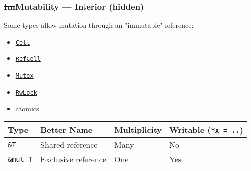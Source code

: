 \documentclass[t]{beamer}
\begin{document}
\begin{frame}[fragile]
\frametitle{\st{Im}Mutability --- Interior (hidden)}

Some types allow mutation through an "immutable" reference:

\begin{itemize}
\item \href{https://doc.rust-lang.org/std/cell/struct.Cell.html}{\texttt{Cell}}
\item \href{https://doc.rust-lang.org/std/cell/struct.RefCell.html}{\texttt{RefCell}}
\item \href{https://doc.rust-lang.org/std/sync/struct.Mutex.html}{\texttt{Mutex}}
\item \href{https://doc.rust-lang.org/std/sync/struct.RwLock.html}{\texttt{RwLock}}
\item \href{https://doc.rust-lang.org/std/sync/atomic/}{atomics}
\end{itemize}

\bigskip

\begin{tabular}{l l l l}
Type & Better Name & Multiplicity & Writable (\texttt{*x = ..}) \\
\hline
\texttt{\&T} & Shared reference & Many & No \\
\texttt{\&mut T} & Exclusive reference & One & Yes
\end{tabular}

\end{frame}
\end{document}
